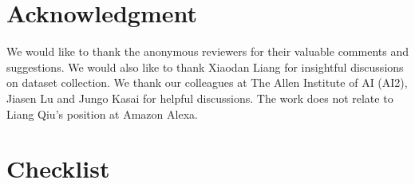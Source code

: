 \section{Acknowledgment}

We would like to thank the anonymous reviewers for their valuable comments and suggestions. We would also like to thank Xiaodan Liang for insightful discussions on dataset collection. We thank our colleagues at The Allen Institute of AI (AI2), Jiasen Lu and Jungo Kasai for helpful discussions. The work does not relate to Liang Qiu's position at Amazon Alexa.


 
{
\small

}


\section*{Checklist}



